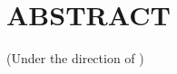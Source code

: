 \section*{\uppercase{Abstract}}
\label{sec:abstract}

\noindent{\MakeUppercase \ETDAUTHOR}

\noindent\ETDTITLE

\noindent(Under the direction of {\MakeUppercase \ETDADVISOR})

\vspace{2em}
\noindent

\vspace{2em}

